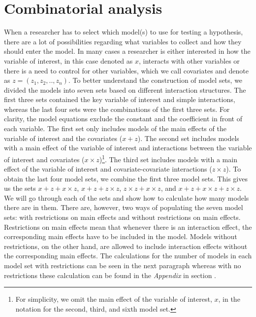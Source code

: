 \section{Combinatorial analysis}

When a researcher has to select which model(s) to use for testing a hypothesis, there are a lot of possibilities regarding what variables to collect and how they should enter the model. In many cases a researcher is either interested in how the variable of interest, in this case denoted as $x$, interacts with other variables or there is a need to control for other variables, which we call covariates and denote as $z=(z_1,z_2,..,z_n)$. 
To better understand the construction of model sets, we divided the models into seven sets based on different interaction structures. The first three sets contained the key variable of interest and simple interactions, whereas the last four sets were the combinations of the first three sets. For clarity, the model equations exclude the constant and the coefficient in front of each variable. The first set only includes models of the main effects of the variable of interest and the covariates ($x + z$). The second set includes models with a main effect of the variable of interest and interactions between the variable of interest and covariates ($x \times z$)\footnote{For simplicity, we omit the main effect of the variable of interest, $x$, in the notation for the second, third, and sixth model set.}. The third set includes models with a main effect of the variable of interest and covariate-covariate interactions ($z \times z$).
To obtain the last four model sets, we combine the first three model sets. This gives us the sets $x + z + x \times z$, $x + z + z \times z$, $z \times z + x \times z$, and $x + z + x \times z + z \times z$. We will go through each of the sets and show how to calculate how many models there are in them. There are, however, two ways of populating the seven model sets: with restrictions on main effects and without restrictions on main effects. Restrictions on main effects mean that whenever there is an interaction effect, the corresponding main effects have to be included in the model. Models without restrictions, on the other hand, are allowed to include interaction effects without the corresponding main effects. The calculations for the number of models in each model set with restrictions can be seen in the next paragraph whereas with no restrictions these calculation can be found in the \textit{Appendix} in section . 

